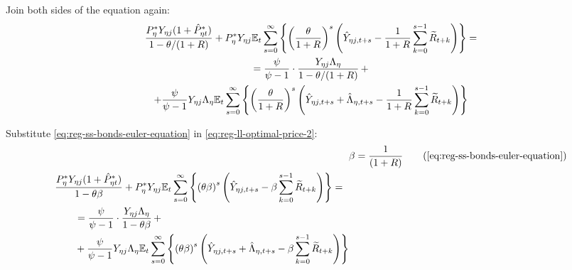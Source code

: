 \documentclass[../thesis.tex]{subfiles}
\begin{document}
Join both sides of the equation again:
\begin{multline}
	\frac{ P_{\eta}^{\ast} Y_{\eta j} ( 1 + \hat{P}_{\eta t}^{\ast} )}{1-\theta /(1+R)} + P_{\eta}^{\ast} Y_{\eta j} {\mathbb{E}_{t}} \sum_{s=0}^{\infty} \left\{ \left( \frac{\theta}{1 + R} \right)^s \left( \hat{Y}_{\eta j, t+s} - \frac{1}{1 + R} \sum_{k=0}^{s-1} \widetilde{R}_{t+k} \right) \right\} = 
	\\
	= \frac{\psi}{\psi-1} \cdot \frac{Y_{\eta j} \Lambda_{\eta}}{1-\theta /(1+R)} \, + 
	\\
	+ \frac{\psi}{\psi-1} Y_{\eta j} \Lambda_{\eta} {\mathbb{E}_{t}} \sum_{s=0}^{\infty} \left\{ \left( \frac{\theta}{1 + R} \right)^s \left( \hat{Y}_{\eta j, t+s} + \hat{\Lambda}_{\eta, t+s} - \frac{1}{1 + R} \sum_{k=0}^{s-1} \widetilde{R}_{t+k} \right) \right\} \label{eq:reg-ll-optimal-price-2}
\end{multline}

Substitute \ref{eq:reg-ss-bonds-euler-equation} in \ref{eq:reg-ll-optimal-price-2}:
\begin{align}
	& \beta = \frac{1}{(1 + R)} \tag{\ref{eq:reg-ss-bonds-euler-equation}} \\
	\begin{split} & \frac{ P_{\eta}^{\ast} Y_{\eta j} ( 1 + \hat{P}_{\eta t}^{\ast} )}{1- \theta \beta} + P_{\eta}^{\ast} Y_{\eta j} \E \sum_{s=0}^{\infty} \left\{ \left( \theta \beta \right)^s \left( \hat{Y}_{\eta j, t+s} - \beta \sum_{k=0}^{s-1} \widetilde{R}_{t+k} \right) \right\} = \\ & \qquad = \frac{\psi}{\psi-1} \cdot \frac{Y_{\eta j} \Lambda_{\eta}}{1- \theta \beta} \, + \\ & \qquad + \frac{\psi}{\psi-1} Y_{\eta j} \Lambda_{\eta} \E \sum_{s=0}^{\infty} \left\{ \left( \theta \beta \right)^s \left( \hat{Y}_{\eta j, t+s} + \hat{\Lambda}_{\eta, t+s} - \beta \sum_{k=0}^{s-1} \widetilde{R}_{t+k} \right) \right\} \end{split} \label{eq:reg-ll-optimal-price-3}
\end{align}
\end{document}
